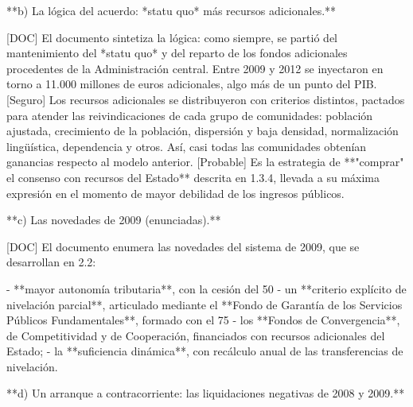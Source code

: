 \documentclass[10pt,a4paper]{article}
\begin{document}
**b) La lógica del acuerdo: *statu quo* más recursos adicionales.**

[DOC] El documento sintetiza la lógica: como siempre, se partió del mantenimiento del *statu quo* y del reparto de los fondos adicionales procedentes de la Administración central. Entre 2009 y 2012 se inyectaron en torno a 11.000 millones de euros adicionales, algo más de un punto del PIB. [Seguro] Los recursos adicionales se distribuyeron con criterios distintos, pactados para atender las reivindicaciones de cada grupo de comunidades: población ajustada, crecimiento de la población, dispersión y baja densidad, normalización lingüística, dependencia y otros. Así, casi todas las comunidades obtenían ganancias respecto al modelo anterior. [Probable] Es la estrategia de **"comprar" el consenso con recursos del Estado** descrita en 1.3.4, llevada a su máxima expresión en el momento de mayor debilidad de los ingresos públicos.

**c) Las novedades de 2009 (enunciadas).**

[DOC] El documento enumera las novedades del sistema de 2009, que se desarrollan en 2.2:

- **mayor autonomía tributaria**, con la cesión del 50%
- un **criterio explícito de nivelación parcial**, articulado mediante el **Fondo de Garantía de los Servicios Públicos Fundamentales**, formado con el 75%
- los **Fondos de Convergencia**, de Competitividad y de Cooperación, financiados con recursos adicionales del Estado;
- la **suficiencia dinámica**, con recálculo anual de las transferencias de nivelación.

**d) Un arranque a contracorriente: las liquidaciones negativas de 2008 y 2009.**
\end{document}
